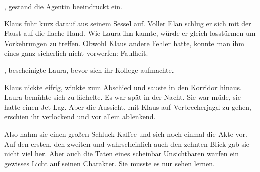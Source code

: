 \par

, gestand die Agentin beeindruckt ein.

\par

Klaus fuhr kurz darauf aus seinem Sessel auf.
Voller Elan schlug er sich mit der Faust auf die flache Hand.
Wie Laura ihn kannte, würde er gleich losstürmen um Vorkehrungen zu treffen.
Obwohl Klaus andere Fehler hatte, konnte man ihm eines ganz sicherlich nicht vorwerfen: Faulheit.

\par


\par

, bescheinigte Laura, bevor sich ihr Kollege aufmachte.

\par

Klaus nickte eifrig, winkte zum Abschied und sauste in den Korridor hinaus.
Laura bemühte sich zu lächelte.
Es war spät in der Nacht.
Sie war müde, sie hatte einen Jet-Lag.
Aber die Aussicht, mit Klaus auf Verbrecherjagd zu gehen, erschien ihr verlockend und vor allem ablenkend.

\par

Also nahm sie einen großen Schluck Kaffee und sich noch einmal die Akte vor.
Auf den ersten, den zweiten und wahrscheinlich auch den zehnten Blick gab sie nicht viel her.
Aber auch die Taten eines scheinbar Unsichtbaren warfen ein gewisses Licht auf seinen Charakter.
Sie musste es nur sehen lernen.